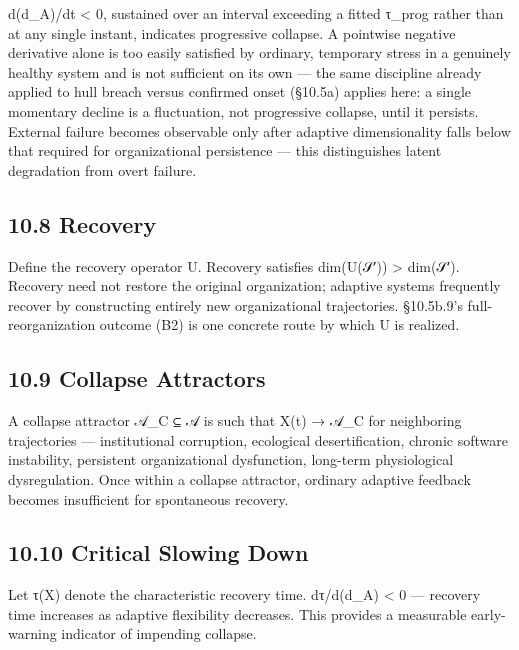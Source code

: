 \documentclass[
]{article}
\begin{document}
d(d\_A)/dt \textless{} 0, sustained over an interval exceeding a fitted
τ\_prog rather than at any single instant, indicates progressive
collapse. A pointwise negative derivative alone is too easily satisfied
by ordinary, temporary stress in a genuinely healthy system and is not
sufficient on its own --- the same discipline already applied to hull
breach versus confirmed onset (§10.5a) applies here: a single momentary
decline is a fluctuation, not progressive collapse, until it persists.
External failure becomes observable only after adaptive dimensionality
falls below that required for organizational persistence --- this
distinguishes latent degradation from overt failure.

\hypertarget{recovery}{%
\subsection{10.8 Recovery}\label{recovery}}

Define the recovery operator U. Recovery satisfies dim(U(𝒮′))
\textgreater{} dim(𝒮′). Recovery need not restore the original
organization; adaptive systems frequently recover by constructing
entirely new organizational trajectories. §10.5b.9's full-reorganization
outcome (B2) is one concrete route by which U is realized.

\hypertarget{collapse-attractors}{%
\subsection{10.9 Collapse Attractors}\label{collapse-attractors}}

A collapse attractor 𝒜\_C ⊆ 𝒜 is such that X(t) → 𝒜\_C for neighboring
trajectories --- institutional corruption, ecological desertification,
chronic software instability, persistent organizational dysfunction,
long-term physiological dysregulation. Once within a collapse attractor,
ordinary adaptive feedback becomes insufficient for spontaneous
recovery.

\hypertarget{critical-slowing-down}{%
\subsection{10.10 Critical Slowing Down}\label{critical-slowing-down}}

Let τ(X) denote the characteristic recovery time. dτ/d(d\_A) \textless{}
0 --- recovery time increases as adaptive flexibility decreases. This
provides a measurable early-warning indicator of impending collapse.
\end{document}
